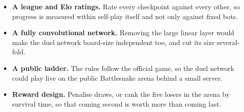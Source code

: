 \begin{itemize}
\item \textbf{A league and Elo ratings.} Rate every checkpoint against every other, so
  progress is measured within self-play itself and not only against fixed bots.
\item \textbf{A fully convolutional network.} Removing the large linear layer would make
  the duel network board-size independent too, and cut its size several-fold.
\item \textbf{A public ladder.} The rules follow the official game, so the duel network
  could play live on the public Battlesnake arena behind a small server.
\item \textbf{Reward design.} Penalise draws, or rank the five losers in the arena by
  survival time, so that coming second is worth more than coming last.
\end{itemize}
